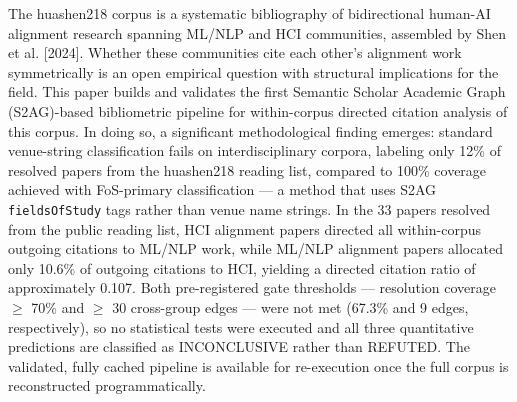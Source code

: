 
The huashen218 corpus is a systematic bibliography of bidirectional human-AI alignment research spanning ML/NLP and HCI communities, assembled by Shen et al. [2024]. Whether these communities cite each other's alignment work symmetrically is an open empirical question with structural implications for the field. This paper builds and validates the first Semantic Scholar Academic Graph (S2AG)-based bibliometric pipeline for within-corpus directed citation analysis of this corpus. In doing so, a significant methodological finding emerges: standard venue-string classification fails on interdisciplinary corpora, labeling only 12\% of resolved papers from the huashen218 reading list, compared to 100\% coverage achieved with FoS-primary classification --- a method that uses S2AG \texttt{fieldsOfStudy} tags rather than venue name strings. In the 33 papers resolved from the public reading list, HCI alignment papers directed all within-corpus outgoing citations to ML/NLP work, while ML/NLP alignment papers allocated only 10.6\% of outgoing citations to HCI, yielding a directed citation ratio of approximately 0.107. Both pre-registered gate thresholds --- resolution coverage $\geq$ 70\% and $\geq$ 30 cross-group edges --- were not met (67.3\% and 9 edges, respectively), so no statistical tests were executed and all three quantitative predictions are classified as INCONCLUSIVE rather than REFUTED. The validated, fully cached pipeline is available for re-execution once the full corpus is reconstructed programmatically.

